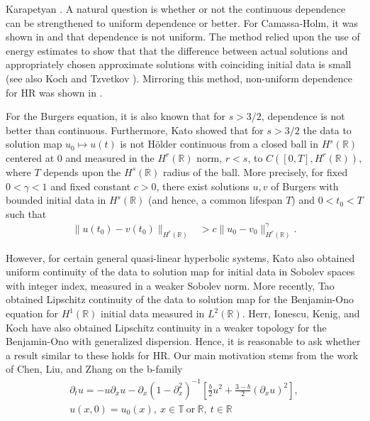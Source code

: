 \documentclass[12pt,reqno]{amsart}
\numberwithin{equation}{section}  %
\numberwithin{figure}{section}
\newcommand{\rr}{\mathbb{R}}
\newcommand{\ci}{\mathbb{T}}
\newcommand{\p}{\partial}
\begin{document}
Karapetyan \cite{Karapetyan:2010hk}. A natural question is whether or not the
continuous dependence can be strengthened to uniform dependence or better. For
Camassa-Holm, it was shown in \cite{Himonas:2009ck} and \cite{Himonas:2010vp} 
that dependence is not uniform. The method relied upon the use of energy
estimates to show that that the difference between actual solutions and appropriately chosen approximate solutions with coinciding initial data is small (see
also Koch and Tzvetkov \cite{Koch:2005pv}). Mirroring this method,
non-uniform dependence for HR was shown in \cite{Karapetyan:2010hk}. 
\par
For the Burgers equation, it is also known that for $s > 3/2$, dependence is not
better than continuous. Furthermore, Kato \cite{Kato:1975dn}
showed that for $s > 3/2$ the data to solution map $u_{0} \mapsto u(t)$ is not
H\"older continuous from a closed ball in $H^{s}(\rr)$ centered at $0$ and measured
in the $H^{r}(\rr)$ norm, $r < s$, to $C([0, T], H^{r}(\rr))$, where $T$ depends upon
the $H^{s}(\rr)$ radius of the ball. More precisely, for fixed $0 < \gamma < 1$
and fixed constant $c > 0$,
there exist solutions $u, v$ of Burgers with bounded initial data in $H^{s}(\rr)$
(and hence, a common lifespan $T$) and $0 < t_{0} < T$ such that
%
%
\begin{equation*}
\begin{split}
\| u(t_{0}) - v(t_{0}) \|_{H^{r}(\rr)} 
& > c \| u_{0} - v_{0} \|^{\gamma}_{H^{r}(\rr)}.
\end{split}
\end{equation*}
\par
However, for certain general quasi-linear hyperbolic systems, Kato also obtained
uniform continuity of the data to solution map for initial data in Sobolev
spaces with integer index, measured in a weaker Sobolev norm. More recently, Tao
\cite{Tao:2004rg} obtained Lipschitz continuity of the data to solution map
for the Benjamin-Ono equation for $H^{1}(\rr)$ initial data measured in $L^{2}(\rr)$.
Herr, Ionescu, Kenig, and Koch \cite{Herr:2010rv} have also obtained Lipschitz
continuity in a weaker topology for the Benjamin-Ono with generalized
dispersion. Hence, it is reasonable to ask whether a result similar to these
holds for HR\@. Our main motivation stems from the work of Chen, Liu, and Zhang
\cite{Chen:2011aa} on the
b-family
%
%
\begin{gather}
\p_t u =  -u \p_x u -
\p_{x} (1 - \p_{x}^{2})^{-1} \left[ \frac{b}{2}u^2 +
\frac{3-b}{2} \left( \p_x u \right)^2
\right],
\label{b-family}
\\
u(x,0) = u_0(x), \ x \in \ci \ \text{or} \ \rr, \ t \in \rr
\label{init-cond-b-fam}
\end{gather}
\end{document}
